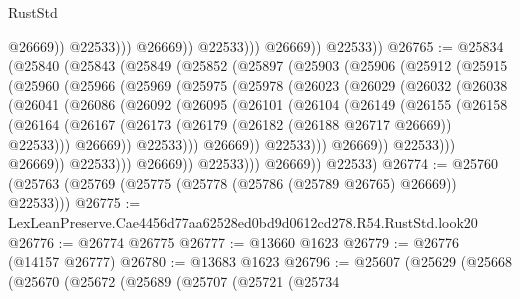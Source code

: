 \begin{lexlean}{RustStd}
\begin{coremodule}
                                @26669))
                            @22533)))
                      @26669))
                  @22533)))
            @26669))
        @22533))
@26765 := @25834
    (@25840
      (@25843
        (@25849
          (@25852
            (@25897
              (@25903
                (@25906
                  (@25912
                    (@25915
                      (@25960
                        (@25966
                          (@25969
                            (@25975
                              (@25978
                                (@26023
                                  (@26029
                                    (@26032
                                      (@26038
                                        (@26041
                                          (@26086
                                            (@26092
                                              (@26095
                                                (@26101
                                                  (@26104
                                                    (@26149
                                                      (@26155
                                                        (@26158
                                                          (@26164
                                                            (@26167
                                                              (@26173
                                                                (@26179
                                                                  (@26182 (@26188 @26717 @26669))
                                                                  @22533)))
                                                            @26669))
                                                        @22533)))
                                                  @26669))
                                              @22533)))
                                        @26669))
                                    @22533)))
                              @26669))
                          @22533)))
                    @26669))
                @22533)))
          @26669))
      @22533)
@26774 := @25760 (@25763 (@25769 (@25775 (@25778 (@25786 (@25789 @26765) @26669)) @22533)))
@26775 := LexLeanPreserve.Cae4456d77aa62528ed0bd9d0612cd278.R54.RustStd.look20
@26776 := @26774 @26775
@26777 := @13660 @1623
@26779 := @26776 (@14157 @26777)
@26780 := @13683 @1623
@26796 := @25607
    (@25629
      (@25668
        (@25670
          (@25672
            (@25689
              (@25707
                (@25721
                  (@25734

\end{coremodule}
\end{lexlean}
